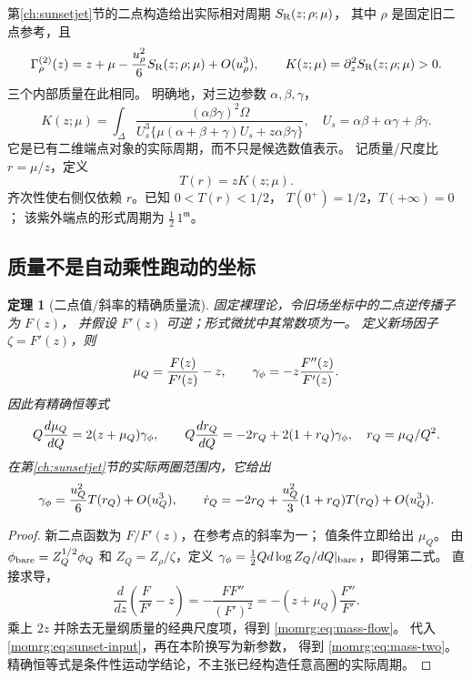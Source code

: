 \documentclass[11pt,a4paper,oneside]{ctexart}
\theoremstyle{cnplain}
\newtheorem{theorem}{定理}[section]
\theoremstyle{definition}
\theoremstyle{remark}
\numberwithin{equation}{section}
\begin{document}
第\ref{ch:sunsetjet}节的二点构造给出实际相对周期 $S_{\mathrm R}(z;\rho;\mu)$，
其中 $\rho$ 是固定旧二点参考，且
\begin{equation}\label{momrg:eq:sunset-input}
 \Gamma_\rho^{(2)}(z)
 =z+\mu-\frac{u_\rho^2}{6}S_{\mathrm R}(z;\rho;\mu)+O(u_\rho^3),
 \qquad
 K(z;\mu)=\partial_z^2S_{\mathrm R}(z;\rho;\mu)>0.
\end{equation}
三个内部质量在此相同。
明确地，对三边参数 $\alpha,\beta,\gamma$，
\begin{equation}\label{momrg:eq:K}
 K(z;\mu)=\int_\Delta
 \frac{(\alpha\beta\gamma)^2\Omega}
 {U_s^3\{\mu(\alpha+\beta+\gamma)U_s+z\alpha\beta\gamma\}},
 \quad U_s=\alpha\beta+\alpha\gamma+\beta\gamma.
\end{equation}
它是已有二维端点对象的实际周期，而不只是候选数值表示。
记质量/尺度比 $r=\mu/z$，定义
\begin{equation}\label{momrg:eq:threshold-sunset}
 T(r)=zK(z;\mu).
\end{equation}
齐次性使右侧仅依赖 $r$。已知 $0<T(r)<1/2$，
$T(0^+)=1/2$，$T(+\infty)=0$；
该紫外端点的形式周期为 $\frac12\,1^{\mathfrak m}$。


\subsection{质量不是自动乘性跑动的坐标}\label{momrg:sec:mass}
\begin{theorem}[二点值/斜率的精确质量流]\label{momrg:thm:mass}
固定裸理论，令旧场坐标中的二点逆传播子为 $F(z)$，
并假设 $F'(z)$ 可逆；形式微扰中其常数项为一。
定义新场因子 $\zeta=F'(z)$，则
\begin{equation}\label{momrg:eq:mass-coordinate}
 \mu_Q=\frac{F(z)}{F'(z)}-z,\qquad
 \gamma_\phi=-z\frac{F''(z)}{F'(z)}.
\end{equation}
因此有精确恒等式
\begin{equation}\label{momrg:eq:mass-flow}
 Q\frac{d\mu_Q}{dQ}=2(z+\mu_Q)\gamma_\phi,\qquad
 Q\frac{dr_Q}{dQ}=-2r_Q+2(1+r_Q)\gamma_\phi,
 \quad r_Q=\mu_Q/Q^2.
\end{equation}
在第\ref{ch:sunsetjet}节的实际两圈范围内，它给出
\begin{equation}\label{momrg:eq:mass-two}
 \gamma_\phi=\frac{u_Q^2}{6}T(r_Q)+O(u_Q^3),\qquad
 \dot r_Q=-2r_Q+\frac{u_Q^2}{3}(1+r_Q)T(r_Q)+O(u_Q^3).
\end{equation}
\end{theorem}
\begin{proof}
新二点函数为 $F/F'(z)$，在参考点的斜率为一；
值条件立即给出 $\mu_Q$。
由 $\phi_{\rm bare}=Z_Q^{1/2}\phi_Q$ 和
$Z_Q=Z_\rho/\zeta$，定义
$\gamma_\phi=\frac12Qd\log Z_Q/dQ|_{\rm bare}$，即得第二式。
直接求导，
\[
 \frac{d}{dz}\left(\frac F{F'}-z\right)
 =-\frac{FF''}{(F')^2}
 =-(z+\mu_Q)\frac{F''}{F'}.
\]
乘上 $2z$ 并除去无量纲质量的经典尺度项，得到
\eqref{momrg:eq:mass-flow}。
代入 \eqref{momrg:eq:sunset-input}，再在本阶换写为新参数，
得到 \eqref{momrg:eq:mass-two}。
精确恒等式是条件性运动学结论，不主张已经构造任意高圈的实际周期。
\end{proof}
\end{document}
